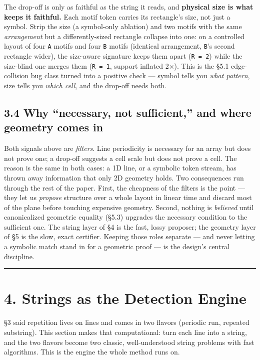 \documentclass[
  11pt,
]{article}
\begin{document}
The drop-off is only as faithful as the string it reads, and
\textbf{physical size is what keeps it faithful.} Each motif token
carries its rectangle's size, not just a symbol. Strip the size (a
symbol-only ablation) and two motifs with the same \emph{arrangement}
but a differently-sized rectangle collapse into one: on a controlled
layout of four \texttt{A} motifs and four \texttt{B} motifs (identical
arrangement, \texttt{B}'s second rectangle wider), the size-aware
signature keeps them apart (\texttt{R\ =\ 2}) while the size-blind one
merges them (\texttt{R\ =\ 1}, support inflated 2×). This is the §5.1
edge-collision bug class turned into a positive check --- symbol tells
you \emph{what pattern}, size tells you \emph{which cell}, and the
drop-off needs both.

\subsection{3.4 Why ``necessary, not sufficient,'' and where geometry
comes
in}\label{why-necessary-not-sufficient-and-where-geometry-comes-in}

Both signals above are \emph{filters}. Line periodicity is necessary for
an array but does not prove one; a drop-off suggests a cell scale but
does not prove a cell. The reason is the same in both cases: a 1D line,
or a symbolic token stream, has thrown away information that only 2D
geometry holds. Two consequences run through the rest of the paper.
First, the cheapness of the filters is the point --- they let us
\emph{propose} structure over a whole layout in linear time and discard
most of the plane before touching expensive geometry. Second, nothing is
\emph{believed} until canonicalized geometric equality (§5.3) upgrades
the necessary condition to the sufficient one. The string layer of §4 is
the fast, lossy proposer; the geometry layer of §5 is the slow, exact
certifier. Keeping those roles separate --- and never letting a symbolic
match stand in for a geometric proof --- is the design's central
discipline.

\begin{center}\rule{0.5\linewidth}{0.5pt}\end{center}

\section{4. Strings as the Detection
Engine}\label{strings-as-the-detection-engine}

§3 said repetition lives on lines and comes in two flavors (periodic
run, repeated substring). This section makes that computational: turn
each line into a string, and the two flavors become two classic,
well-understood string problems with fast algorithms. This is the engine
the whole method runs on.
\end{document}
